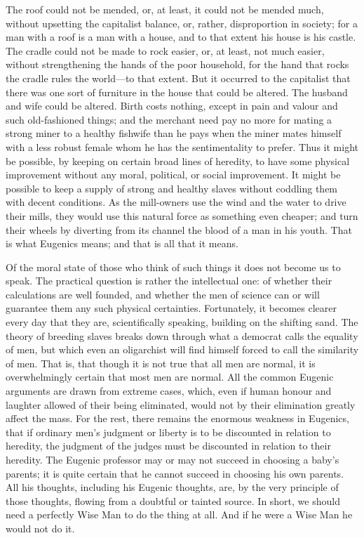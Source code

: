 \documentclass{book}
\begin{document}
The roof could not be mended, or, at least, it could not be mended much, without upsetting the capitalist balance, or, rather, disproportion in society; for a man with a roof is a man with a house, and to that extent his house is his castle. The cradle could not be made to rock easier, or, at least, not much easier, without strengthening the hands of the poor household, for the hand that rocks the cradle rules the world—to that extent. But it occurred to the capitalist that there was one sort of furniture in the house that could be altered. The husband and wife could be altered. Birth costs nothing, except in pain and valour and such old-fashioned things; and the merchant need pay no more for mating a strong miner to a healthy fishwife than he pays when the miner mates himself with a less robust female whom he has the sentimentality to prefer. Thus it might be possible, by keeping on certain broad lines of heredity, to have some physical improvement without any moral, political, or social improvement. It might be possible to keep a supply of strong and healthy slaves without coddling them with decent conditions. As the mill-owners use the wind and the water to drive their mills, they would use this natural force as something even cheaper; and turn their wheels by diverting from its channel the blood of a man in his youth. That is what Eugenics means; and that is all that it means.

Of the moral state of those who think of such things it does not become us to speak. The practical question is rather the intellectual one: of whether their calculations are well founded, and whether the men of science can or will guarantee them any such physical certainties. Fortunately, it becomes clearer every day that they are, scientifically speaking, building on the shifting sand. The theory of breeding slaves breaks down through what a democrat calls the equality of men, but which even an oligarchist will find himself forced to call the similarity of men. That is, that though it is not true that all men are normal, it is overwhelmingly certain that most men are normal. All the common Eugenic arguments are drawn from extreme cases, which, even if human honour and laughter allowed of their being eliminated, would not by their elimination greatly affect the mass. For the rest, there remains the enormous weakness in Eugenics, that if ordinary men’s judgment or liberty is to be discounted in relation to heredity, the judgment of the judges must be discounted in relation to their heredity. The Eugenic professor may or may not succeed in choosing a baby’s parents; it is quite certain that he cannot succeed in choosing his own parents. All his thoughts, including his Eugenic thoughts, are, by the very principle of those thoughts, flowing from a doubtful or tainted source. In short, we should need a perfectly Wise Man to do the thing at all. And if he were a Wise Man he would not do it.
\end{document}
